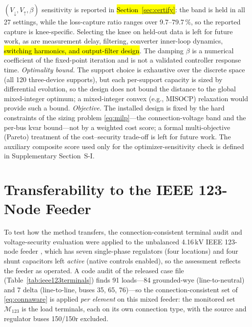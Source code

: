 \documentclass{ieeeaccess}
\newcommand{\rev}[1]{{\color{red}\hl{#1}}}
\newcommand{\rev}[1]{#1}
\providecommand{\percent}{\%}
\newcommand{\num}[1]{#1}
\newcommand{\SI}[2]{#1\,\ensuremath{\mathrm{#2}}}
\newcommand{\SIrange}[3]{#1\mbox{--}#2\,\ensuremath{\mathrm{#3}}}
\begin{document}
$(V_\downarrow,V_\uparrow,\beta)$ sensitivity is reported in
\rev{Section~\mbox{\ref{sec:certify}}}: the band is held in all \num{27} settings, while the
loss-capture ratio ranges over \SIrange{9.7}{79.7}{\percent}, so the reported capture
is knee-specific. Selecting the knee on held-out data is left for future work, as are
measurement delay, filtering, converter inner-loop dynamics, \rev{switching
harmonics, and output-filter design}. The damping $\beta$ is a numerical coefficient
of the fixed-point iteration and is not a validated controller response time.
\emph{Optimality bound.} The support choice is exhaustive over the discrete space
(all 120 three-device supports), but each per-support capacity is sized by
differential evolution, so the design does not bound the distance to the global
mixed-integer optimum; a mixed-integer convex (e.g., MISOCP) relaxation would
provide such a bound.
\emph{Objective.} The installed design is fixed by the hard constraints of the
sizing problem \eqref{eq:milp}---the connection-voltage band and the per-bus kvar
bound---not by a weighted cost score; a formal multi-objective (Pareto) treatment
of the cost--security trade-off is left for future work. The auxiliary composite
score used only for the optimizer-sensitivity check is defined in Supplementary
Section~S-I.
\section{Transferability to the IEEE 123-Node Feeder}
\label{sec:ieee123}
To test how the method transfers, the connection-consistent terminal audit and
voltage-security evaluation were applied to the unbalanced \SI{4.16}{kV} IEEE
123-node feeder \cite{ieee123feeder}, which has seven single-phase regulators (four
locations) and four shunt capacitors left \emph{active}
(native controls enabled), so the assessment reflects the feeder as operated. A
code audit of the released case file (Table~\ref{tab:ieee123terminals}) finds
\num{91} loads---\num{84} grounded-wye (line-to-neutral) and \num{7} delta
(line-to-line, buses 35, 65, 76)---so the connection-consistent set of
\eqref{eq:connaware} is applied \emph{per element} on this mixed feeder: the
monitored set $\mathcal M_{123}$ is the load terminals, each on its own connection
type, with the source and regulator buses 150/150r excluded.
\end{document}
